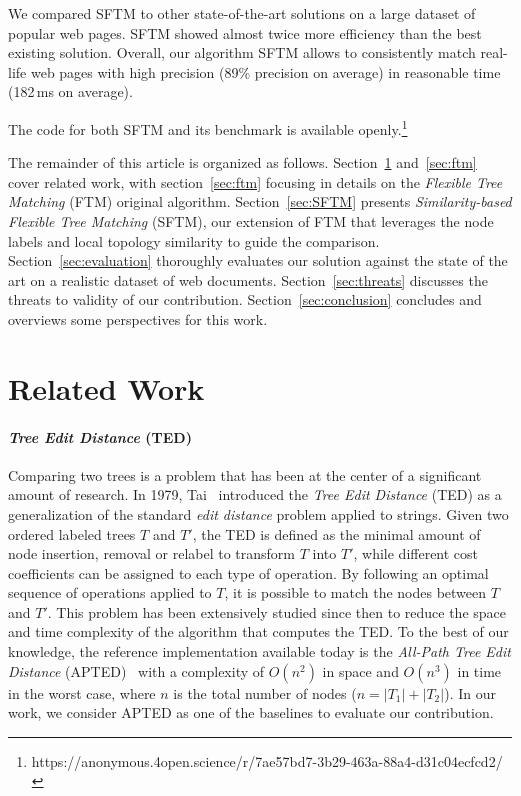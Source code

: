 We compared SFTM to other state-of-the-art solutions on a large dataset of popular web pages.
SFTM showed almost twice more efficiency than the best existing solution.
Overall, our algorithm SFTM allows to consistently match real-life web pages with high precision (89\% precision on average) in reasonable time (182\,ms on average).

The code for both SFTM and its benchmark is available openly.\footnote{https://anonymous.4open.science/r/7ae57bd7-3b29-463a-88a4-d31c04ecfcd2/}

The remainder of this article is organized as follows.
Section~\ref{sec:related_work} and~\ref{sec:ftm} cover related work, with section~\ref{sec:ftm} focusing in details on the \emph{Flexible Tree Matching} (FTM) original algorithm.
Section~\ref{sec:SFTM} presents \emph{Similarity-based Flexible Tree Matching} (SFTM), our extension of FTM that leverages the node labels and local topology similarity to guide the comparison.
Section~\ref{sec:evaluation} thoroughly evaluates our solution against the state of the art on a realistic dataset of web documents.
Section~\ref{sec:threats} discusses the threats to validity of our contribution.
Section~\ref{sec:conclusion} concludes and overviews some perspectives for this work.

\section{Related Work}\label{sec:related_work}
\paragraph{\bf \emph{Tree Edit Distance} (TED)}\label{sec:ted}
Comparing two trees is a problem that has been at the center of a significant amount of research.
In 1979, Tai~\cite{Tai1979} introduced the \emph{Tree Edit Distance} (TED) as a generalization of the standard \emph{edit distance} problem applied to strings.
Given two ordered labeled trees $T$ and $T'$, the TED is defined as the minimal amount of node insertion, removal or relabel to transform $T$ into $T'$, while different cost coefficients can be assigned to each type of operation.
By following an optimal sequence of operations applied to $T$, it is possible to match the nodes between $T$ and $T'$.
This problem has been extensively studied since then to reduce the space and time complexity of the algorithm that computes the TED.
To the best of our knowledge, the reference implementation available today is the \emph{All-Path Tree Edit Distance} (APTED)~\cite{Pawlik2011, pawlik2015efficient, pawlik2016tree} with a complexity of $O(n^2)$ in space and $O(n^3)$ in time in the worst case, where $n$ is the total number of nodes ($n = |T_1|+|T_2|$).
In our work, we consider APTED as one of the baselines to evaluate our contribution.

